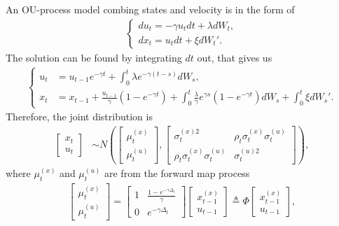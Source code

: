 An OU-process model combing states and velocity is in the form of
\begin{align}
\begin{cases}
du_t = -\gamma u_t dt+ \lambda dW_t,\\
dx_t = u_t dt+\xi dW_t'.
\end{cases}
\end{align}
The solution can be found by integrating $dt$ out, that gives us 
\begin{align}
\begin{cases}
u_t &=u_{t-1}e^{-\gamma t} +\int_{0}^{t} \lambda e^{-\gamma (t-s)}dW_s,\\
x_t &=x_{t-1} +\frac{u_{t-1}}{\gamma}(1- e^{-\gamma t}) + \int_{0}^{t} \frac{\lambda}{\gamma}e^{\gamma  s} \left(1-e^{-\gamma t}\right)dW_s + \int_{0}^{t}\xi dW_s'.
\end{cases}
\end{align}
Therefore,  the joint distribution is 
\begin{align}
\begin{bmatrix} x_t \\ u_t \end{bmatrix} &\sim N\left(
\begin{bmatrix}\mu_t^{(x)} \\ \mu_t^{(u)}  \end{bmatrix} , 
\begin{bmatrix}
\sigma_t^{(x)2} & \rho_t\sigma_t^{(x)} \sigma_t^{(u)} \\
\rho_t\sigma_t^{(x)} \sigma_t^{(u)} & \sigma_t^{(u)2}
\end{bmatrix} \right),
\end{align}
where $\mu_t^{(x)}$ and $\mu_t^{(u)} $ are from the forward map process 
\begin{align}
\begin{bmatrix}\mu_t^{(x)} \\ \mu_t^{(u)}  \end{bmatrix}  = 
\begin{bmatrix}
1 & \frac{1-e^{-\gamma \Delta_t}}{\gamma} \\ 0 &  e^{-\gamma \Delta_t}
\end{bmatrix}  \begin{bmatrix} x_{t-1}^{(x)} \\ u_{t-1}  \end{bmatrix} \triangleq \Phi \begin{bmatrix} x_{t-1}^{(x)} \\ u_{t-1}  \end{bmatrix},
\end{align}
